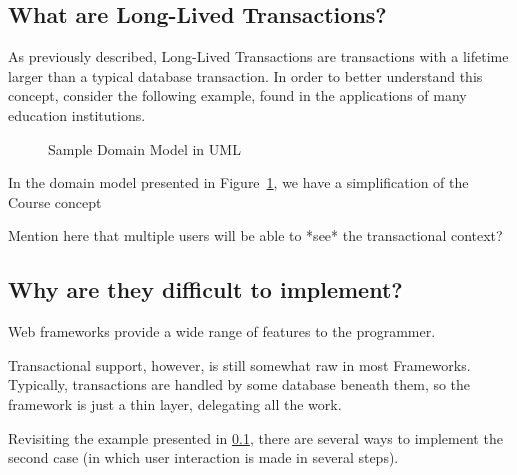 \documentclass{llncs}
\begin{document}
\subsection{What are Long-Lived Transactions?}
\label{sec:what}

As previously described, Long-Lived Transactions are transactions with
a lifetime larger than a typical database transaction. In order to
better understand this concept, consider the following example, found
in the applications of many education institutions.

\begin{figure}
\centering
{}

\caption{Sample Domain Model in UML} 
\label{fig:courseDomain}

\end{figure}

In the domain model presented in Figure~\ref{fig:courseDomain}, we
have a simplification of the Course concept

Mention here that multiple users will be able to *see* the
transactional context?

\subsection{Why are they difficult to implement?}

Web frameworks provide a wide range of features to the
programmer. 

Transactional support, however, is still somewhat raw in most
Frameworks. Typically, transactions are handled by some database
beneath them, so the framework is just a thin layer, delegating all
the work.

Revisiting the example presented in \ref{sec:what}, there are several
ways to implement the second case (in which user interaction is made
in several steps).
\end{document}
